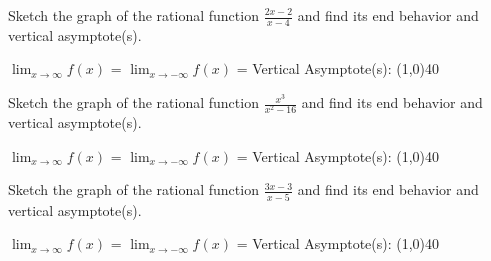 \documentclass[../main.tex]{subfiles}
\begin{document}
\begin{questions}
    \question[1] Sketch the graph of the rational function $\frac{2x - 2}{x - 4}$ and find its end behavior and vertical asymptote(s).
    
        \begin{left} 
        \end{left}
    
    $\lim_{x\to\infty} f(x)$ =
    \newline
    $\lim_{x\to-\infty} f(x)$ =
    \newline
    Vertical Asymptote(s): \line(1,0){40} \\
    
    \question[1] Sketch the graph of the rational function $\frac{x^3}{x^2 - 16}$ and find its end behavior and vertical asymptote(s).
    
        \begin{left} 
        \end{left}
        
    $\lim_{x\to\infty} f(x)$ =
    \newline
    $\lim_{x\to-\infty} f(x)$ =
    \newline
    Vertical Asymptote(s): \line(1,0){40} \\
   
    \question[1] Sketch the graph of the rational function $\frac{3x - 3}{x - 5}$ and find its end behavior and vertical asymptote(s).
    
        \begin{left} 
        \end{left}
        
    $\lim_{x\to\infty} f(x)$ =
    \newline
    $\lim_{x\to-\infty} f(x)$ =
    \newline
    Vertical Asymptote(s): \line(1,0){40} \\
    

\end{questions}
\end{document}

